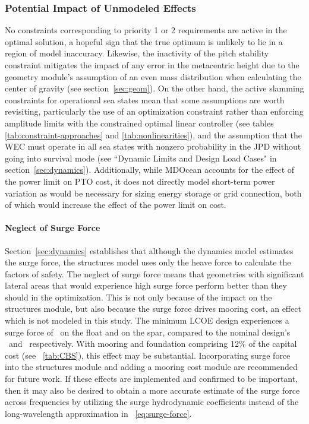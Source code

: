 \subsubsection{Potential Impact of Unmodeled Effects}
No constraints corresponding to priority 1 or 2 requirements are active in the optimal solution, %
a hopeful sign that the true optimum is unlikely to lie in a region of model inaccuracy.
Likewise, the inactivity of the pitch stability constraint mitigates the impact of any error in the metacentric height due to the geometry module's assumption of an even mass distribution when calculating the center of gravity (see section~\ref{sec:geom}).
On the other hand, the active slamming constraints for operational sea states mean that some assumptions are worth revisiting, particularly the use of an optimization constraint rather than enforcing amplitude limits with the constrained optimal linear controller (see tables \ref{tab:constraint-approaches} and \ref{tab:nonlinearities}), and the assumption that the WEC must operate in all sea states with nonzero probability in the JPD without going into survival mode (see ``Dynamic Limits and Design Load Cases" in section~\ref{sec:dynamics}).
Additionally, while MDOcean accounts for the effect of the power limit on PTO cost, it does not directly model short-term power variation as would be necessary for sizing energy storage or grid connection, both of which would increase the effect of the power limit on cost.

\paragraph{Neglect of Surge Force}
Section~\ref{sec:dynamics} establishes that although the dynamics model estimates the surge force, the structures model uses only the heave force to calculate the factors of safety.
The neglect of surge force means that geometries with significant lateral areas that would experience high surge force perform better than they should in the optimization.
This is not only because of the impact on the structures module, but also because the surge force drives mooring cost, an effect which is not modeled in this study.
The minimum LCOE design experiences a surge force of \surgeForceFloatAtMinLCOE~on the float and \surgeForceSparAtMinLCOE on the spar, compared to the nominal design's \surgeForceFloatNominal~and \surgeForceSparNominal~respectively.
With mooring and foundation comprising 12\% of the capital cost (see \tableautorefname~\ref{tab:CBS}), this effect may be substantial.
Incorporating surge force into the structures module and adding a mooring cost module are recommended for future work.
If these effects are implemented and confirmed to be important, then it may also be desired to obtain a more accurate estimate of the surge force across frequencies by utilizing the surge hydrodynamic coefficients instead of the long-wavelength approximation in \equationautorefname~\ref{eq:surge-force}. 

